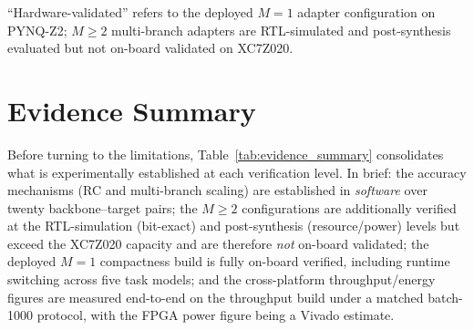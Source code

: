 \documentclass[12pt, a4paper]{report}
\numberwithin{equation}{chapter}
\numberwithin{figure}{chapter}
\numberwithin{table}{chapter}
\numberwithin{algorithm}{chapter}
\begin{document}
\begin{table}[H]
\centering
\caption{Hardware-Validation Status of 1-Bit Adapters in the Cited Works.}
\label{tab:wins_hw_valid}
\begin{flushleft}
\footnotesize ``Hardware-validated'' refers to the deployed $M{=}1$ adapter configuration on PYNQ-Z2; $M{\geq}2$ multi-branch adapters are RTL-simulated and post-synthesis evaluated but not on-board validated on XC7Z020.
\end{flushleft}
\end{table}

\section{Evidence Summary}
\label{sec:evidence_summary}

Before turning to the limitations, Table~\ref{tab:evidence_summary} consolidates what is experimentally established at each verification level. In brief: the accuracy mechanisms (RC and multi-branch scaling) are established in \emph{software} over twenty backbone--target pairs; the $M{\geq}2$ configurations are additionally verified at the RTL-simulation (bit-exact) and post-synthesis (resource/power) levels but exceed the XC7Z020 capacity and are therefore \emph{not} on-board validated; the deployed $M{=}1$ compactness build is fully on-board verified, including runtime switching across five task models; and the cross-platform throughput/energy figures are measured end-to-end on the throughput build under a matched batch-1000 protocol, with the FPGA power figure being a Vivado estimate.
\end{document}
